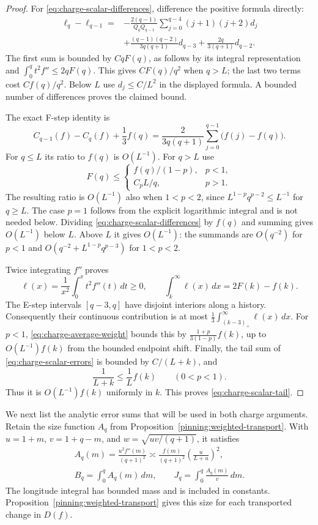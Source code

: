 \begin{proof}
For \eqref{eq:charge-scalar-differences}, difference the positive
formula directly:
\[
\begin{split}
 \ell_q-\ell_{q-1}
 ={}&-\frac{2(q-1)}{Q_qQ_{q-1}}
      \sum_{j=0}^{q-4}(j+1)(j+2)d_j\\
 &+\frac{(q-1)(q-2)}{3q(q+1)}d_{q-3}
  +\frac{2q}{3(q+1)}d_{q-2}.
\end{split}
\]
The first sum is bounded by $CqF(q)$, as follows by its integral
representation and $\int_0^q t^2f''\le2qF(q)$.
This gives $CF(q)/q^2$ when $q>L$; the last two terms cost
$Cf(q)/q^2$.  Below $L$ use $d_j\le C/L^2$ in the displayed
formula.  A bounded number of differences proves the claimed bound.

The exact F-step identity is
\[
 C_{q-1}(f)-C_q(f)+\frac13 f(q)
 =\frac{2}{3q(q+1)}\sum_{j=0}^{q-1}\bigl(f(j)-f(q)\bigr).
\]
For $q\le L$ its ratio to $f(q)$ is $O(L^{-1})$.  For $q>L$ use
\begin{equation}\label{eq:charge-average-weight}
 F(q)\le
 \begin{cases}
 f(q)/(1-p),&p<1,\\
 C_pL/q,&p>1.
 \end{cases}
\end{equation}
The resulting ratio is $O(L^{-1})$ also when $1<p<2$, since
$L^{1-p}q^{p-2}\le L^{-1}$ for $q\ge L$.
The case $p=1$ follows from the explicit logarithmic integral and is
not needed below.  Dividing \eqref{eq:charge-scalar-differences} by
$f(q)$ and summing gives $O(L^{-1})$ below $L$.  Above $L$ it
gives $O(L^{-1})$: the summands are $O(q^{-2})$ for $p<1$ and
$O(q^{-2}+L^{1-p}q^{p-3})$ for $1<p<2$.

Twice integrating $f''$ proves
\[
 \ell(x)=\frac1{x^2}\int_0^x t^2f''(t)\,dt\ge0,
 \qquad
 \int_k^\infty\ell(x)\,dx=2F(k)-f(k).
\]
The E-step intervals $[q-3,q]$ have disjoint interiors along a history.
Consequently their continuous contribution is at most
$\frac13\int_{(k-3)_+}^{\infty}\ell(x)\,dx$.
For $p<1$, \eqref{eq:charge-average-weight} bounds this by
$\frac{1+p}{3(1-p)}f(k)$, up to $O(L^{-1})f(k)$ from the bounded
endpoint shift.  Finally, the tail sum of
\eqref{eq:charge-scalar-errors} is bounded by $C/(L+k)$, and
\[
 \frac1{L+k}\le\frac1L f(k)\qquad(0<p<1).
\]
Thus it is $O(L^{-1})f(k)$ uniformly in $k$.
This proves \eqref{eq:charge-scalar-tail}.
\end{proof}

We next list the analytic error sums that will be used in both charge
arguments.  Retain the size function $A_q$ from
Proposition~\ref{pinning:weighted-transport}.  With $u=1+m$,
$v=1+q-m$, and $w=\sqrt{uv/(q+1)}$, it satisfies
\begin{equation}\label{eq:charge-size}
 \begin{gathered}
 A_q(m)=\frac{u^2f''(m)}{(q+1)^2}
 \asymp\frac{f(m)}{(q+1)^2}\left(\frac{u}{L+u}\right)^2,\\
 B_q=\int_0^q A_q(m)\,dm,\qquad
 J_q=\int_0^q\frac{A_q(m)}v\,dm.
 \end{gathered}
\end{equation}
The longitude integral has bounded mass and is included in constants.
Proposition~\ref{pinning:weighted-transport} gives this size for each
transported change in $D(f)$.

